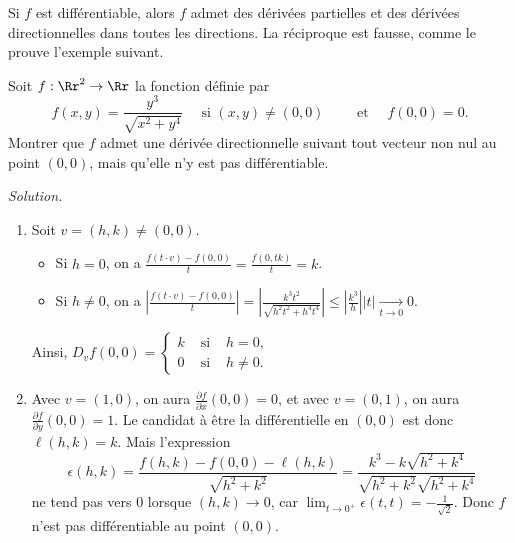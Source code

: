 \bigskip



Si $f$ est différentiable, alors $f$ admet des dérivées partielles et des dérivées directionnelles dans toutes les directions. La réciproque est fausse, comme le prouve l'exemple suivant.

\begin{exemple}{}{}
	Soit $f:\Rr^2\to \Rr$ la fonction définie par
	$$f(x,y)=\frac{y^3}{\sqrt{x^2+y^4}}\quad \text{ si }(x,y)\neq (0,0)\qquad \text{ et }\quad f(0,0)=0.$$
	Montrer que $f$ admet une dérivée directionnelle suivant tout vecteur non nul au point $(0,0)$, mais qu'elle n'y est pas différentiable.
	
	
	\bigskip
	\emph{Solution.}
	
	\begin{enumerate}
		\item Soit $v=(h,k)\neq (0,0)$.
		\begin{itemize}
			\item Si $h=0$, on a $\displaystyle \frac{f(t \cdot v)-f(0,0)}{t}=\frac{f(0,tk)}{t}=k$.
			\item Si $h\neq 0$, on a $\displaystyle \left\vert \frac{f(t\cdot v)-f(0,0)}{t}\right\vert= \left\vert \frac{k^3t^2}{\sqrt{h^2t^2+h^4t^4}}\right\vert \le \left\vert \frac{k^3}{h}\right\vert |t|\underset{t\to 0}{\longrightarrow} 0$.
		\end{itemize}
		Ainsi, $\displaystyle D_{v}f(0,0)=
		\left\{
		\begin{array}{ccc}
			k&\text{ si }& h =0, \\ 
			0&\text{ si }& h\neq 0. 
		\end{array}\right.$
		
		
		\item Avec $v=(1,0)$, on aura $\frac{\partial f}{\partial x}(0,0)=0$, et avec $v=(0,1)$, on aura $\frac{\partial f}{\partial y}(0,0)=1$. 
		Le candidat à être la différentielle en $(0,0)$ est donc $\ell(h,k)  = k$.
		Mais l'expression
		$$\epsilon (h,k)=\frac{f(h,k)-f(0,0)-\ell(h,k)}{\sqrt{h^2+k^2}}=\frac{k^3-k\sqrt{h^2+k^4}}{\sqrt{h^2+k^2}\sqrt{h^2+k^4}}$$
		ne tend pas vers $0$ lorsque $(h,k) \to 0$, car $\lim _{t\to 0^+}\epsilon (t,t)=-\frac{1}{\sqrt{2}}$. Donc $f$ n'est pas différentiable au point $(0,0)$. 
	\end{enumerate}
\end{exemple}

\bigskip

